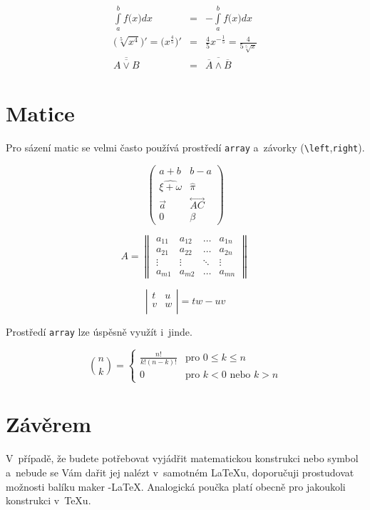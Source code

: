 \documentclass[11pt,twocolumn]{article}
\theoremstyle{definition}
\theoremstyle{plain}
\begin{document}
\begin{eqnarray}   
    \int\limits_{a}^{b} f\big(x\big)dx & = & -\int\limits_{a}^{b} f\big(x\big)dx \\
    \Big(\sqrt[5]{x^4}\Big)' = \Big(x^\frac{4}{5}\Big)' & = & \frac{4}{5}x^{-\frac{1}{5}} = \frac{4}{5\sqrt[5]{x}} \\
    \overline{\overline{A \lor B}} & = & \overline{\overline{A} \land \overline{B}}
\end{eqnarray}

\section {Matice}
Pro sázení matic se velmi často používá prostředí \verb|array| a~závorky (\verb|\left|,\verb|right|).

$$
\left(
\begin{array}{cc}
a + b & b - a \\
\widehat{\xi + \omega} & \hat\pi  \\
\vec{a} & \overset\longleftrightarrow{AC} \\
0 & \beta 
\end{array}
\right)
$$

$$
A = 
\left\| 
\begin{array}{cccc}
a_{11} & a_{12} & \ldots & a_{1n} \\ 
a_{21} & a_{22} & \ldots & a_{2n} \\
\vdots & \vdots & \ddots & \vdots \\
a_{m1} & a_{m2} & \ldots & a_{mn}
\end{array}
\right\|
$$

$$
\left|
\begin{array}{cc}
t & u \\
v & w \\
\end{array}
\right| 
= tw - uv
$$

Prostředí \verb|array| lze úspěsně využít i~jinde.

$$
\binom{n}{k}
=
\left\{
\begin{array}{ll}
\frac{n!}{k!(n-k)!} & \mbox{pro } 0 \leq k \leq n \\
0 & \mbox{pro } k < 0 \mbox{ nebo } k > n
\end{array}
\right.
$$

\section {Závěrem}

V~případě, že budete potřebovat vyjádřit matematickou konstrukci nebo symbol a~nebude se Vám dařit jej nalézt v~samotném \LaTeX u, doporučuji prostudovat možnosti balíku maker \AmS -\LaTeX. Analogická poučka platí obecně pro jakoukoli konstrukci v~\TeX u.
\end{document}

